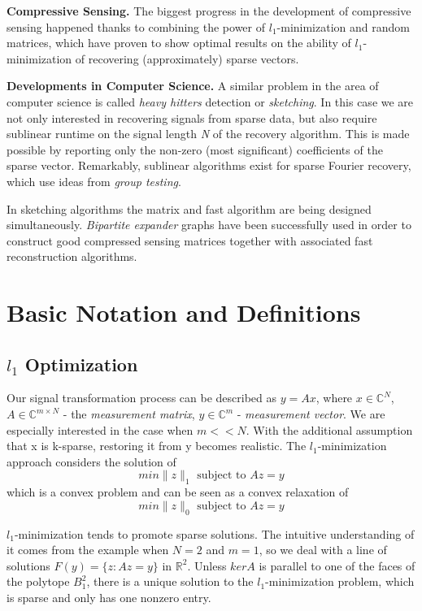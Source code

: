 \documentclass[
  english,        %
  font=times,     %
  onecolumn,      %
]{tumarticle}
\numberwithin{equation}{section} %
\begin{document}
\begin{large}
\begin{adjustwidth}{0pt}{0pt}
\textbf{Compressive Sensing.} The biggest progress in the development of compressive sensing \cite{CS1} happened thanks to combining the power of $l_1$-minimization and random matrices, which have proven to show optimal results on the ability of $l_1$-minimization of recovering (approximately) sparse vectors.

\textbf{Developments in Computer Science.} A similar problem in the area of computer science is called \textit{heavy hitters} detection or \textit{sketching}. In this case we are not only interested in recovering signals from sparse data, but also require sublinear runtime on the signal length \textit{N} of the recovery algorithm. This is made possible by reporting only the non-zero (most significant) coefficients of the sparse vector. Remarkably, sublinear algorithms exist for sparse Fourier recovery, which use ideas from \textit{group testing}.

In sketching algorithms the matrix and fast algorithm are being designed simultaneously. \textit{Bipartite expander} graphs have been successfully used in order to construct good compressed sensing matrices together with associated fast reconstruction algorithms.


\section{Basic Notation and Definitions}

\subsection{$l_1$ Optimization}

Our signal transformation process can be described as $y = Ax$, where $x \in \mathbb{C}^N$, $A \in \mathbb{C}^{m \times N}$ - the \textit{measurement matrix}, $y \in \mathbb{C}^m$ - \textit{measurement vector}. We are especially interested in the case when $m << N$. With the additional assumption that x is k-sparse, restoring it from y becomes realistic. The $l_1$-minimization approach considers the solution of 
\[min \lVert z \rVert _1 \text{ subject to } Az = y\]
which is a convex problem and can be seen as a convex relaxation of
\[min \lVert z \rVert _0 \text{ subject to } Az = y\]

$l_1$-minimization tends to promote sparse solutions. The intuitive understanding of it comes from the example when $N = 2$ and $m = 1$, so we deal with a line of solutions $F(y) = \{z : Az = y\}$ in $\mathbb{R}^2$. Unless $ker A$ is parallel to one of the faces of the polytope $B_1^2$, there is a unique solution to the $l_1$-minimization problem, which is sparse and only has one nonzero entry.


\end{adjustwidth}
\end{large}
\end{document}
